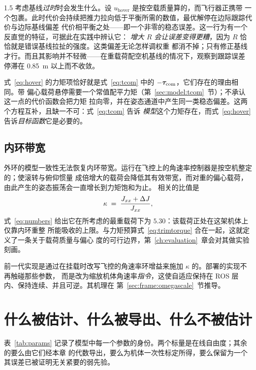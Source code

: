 \begin{spacing}{1.5}
考虑基线\emph{过时}时会发生什么。设 $u_{\mathrm{hover}}$ 是按空载质量算的，而飞行器正携带
一个包裹。此时代价会持续把推力拉向低于平衡所需的数值，最优解停在边际跟踪代价与边际基线偏差
代价相平衡之处——即一个非零的稳态误差。这一行为有一个反直觉的特征，可据此在实践中辨认它：
\emph{增大 $R$ 会让误差变得更糟}，因为 $R$ 恰恰就是错误基线拉扯的强度。这类偏差无论怎样调权重
都消不掉；只有修正基线才行。而且其影响并不轻微——在重载荷配空机基线的情况下，观察到跟踪误差
停滞在 \SI{0.85}{\meter} 以上而不收敛。

式~\eqref{eq:hover} 的力矩项恰好就是式~\eqref{eq:tcom} 中的 $-\bm{\tau}_{\mathrm{com}}$，它们存在的理由相同。带
偏心载荷悬停需要一个常值配平力矩（第~\ref{sec:model:tcom}~节）；不承认这一点的代价函数会把力矩
拉向零，并在姿态通道中产生同一类稳态偏差。这两个方程互补，且缺一不可：式~\eqref{eq:tcom} 告诉
\emph{模型}这个力矩存在，而式~\eqref{eq:hover} 告诉\emph{目标函数}它是必要的。

\subsection{内环带宽}\label{sec:model:gain}

外环的模型一致性无法恢复内环带宽。运行在飞控上的角速率控制器是按空机整定的；使滚转与俯仰惯量
成倍增大的载荷会降低其有效带宽，而对重的偏心载荷，由此产生的姿态振荡会一直增长到力矩饱和为止。
相关的比值是
\begin{equation}
\kappa \;=\; \frac{J_{xx} + \Delta J}{J_{xx}},
\label{eq:gain}
\end{equation}
式~\eqref{eq:numbers} 给出它在所考虑的最重载荷下为 $5.30$：该载荷正处在这架机体上仅靠内环重整
所能吸收的上限。与力矩预算式~\eqref{eq:trimtorque} 合在一起，这就定义了一条关于载荷质量与偏心
度的可行边界，第~\ref{ch:evaluation}~章会对其做实验刻画。

前一代实现是通过在挂载时改写飞控的角速率环增益来施加 $\kappa$ 的。部署的实现不再触碰那些参数，
而是改为缩放机体角速率\emph{指令}，这使自适应保持在 ROS 层内、保持连续、并且可逆。其机理在
第~\ref{sec:frame:omegascale}~节推导。

\section{什么被估计、什么被导出、什么不被估计}\label{sec:model:whynot}

表~\ref{tab:params} 记录了模型中每一个参数的身份。两个标量是在线自由度；其余的要么由它们经本章
的代数导出，要么为机体一次性标定所得，要么保留为一个其误差已被证明无关紧要的弱先验。


\end{spacing}
